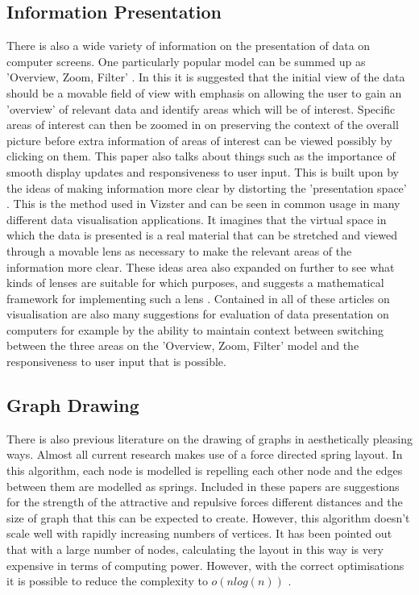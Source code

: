 \documentclass[12pt,a4paper]{article}
\begin{document}
\subsection{Information Presentation}
There is also a wide variety of information on the presentation of data on computer screens. One particularly popular model can be summed up as 'Overview, Zoom, Filter' \cite{shneiderman1996eyes}. In this it is suggested that the initial view of the data should be a movable field of view with emphasis on allowing the user to gain an 'overview' of relevant data and identify areas which will be of interest. Specific areas of interest can then be zoomed in on preserving the context of the overall picture before extra information of areas of interest can be viewed possibly by clicking on them. This paper also talks about things such as the importance of smooth display updates and responsiveness to user input. This is built upon by the ideas of making information more clear by distorting the 'presentation space' \cite{carpendale2001framework}. This is the method used in Vizster and can be seen in common usage in many different data visualisation applications. It imagines that the virtual space in which the data is presented is a real material that can be stretched and viewed through a movable lens as necessary to make the relevant areas of the information more clear. These ideas area also expanded on further to see what kinds of lenses are suitable for which purposes, and suggests a mathematical framework for implementing such a lens \cite{leung1994review}. Contained in all of these articles on visualisation are also many suggestions for evaluation of data presentation on computers for example by the ability to maintain context between switching between the three areas on the 'Overview, Zoom, Filter' model and the responsiveness to user input that is possible.

\subsection{Graph Drawing}
There is also previous literature on the drawing of graphs in aesthetically pleasing ways. Almost all current research makes use of a force directed spring layout. In this algorithm, each node is modelled is repelling each other node and the edges between them are modelled as springs\cite{fruchterman1991graph}. Included in these papers are suggestions for the strength of the attractive and repulsive forces different distances and the size of graph that this can be expected to create. However, this algorithm doesn't scale well with rapidly increasing numbers of vertices. It has been pointed out that with a large number of nodes, calculating the layout in this way is very expensive in terms of computing power. However, with the correct optimisations it is possible to reduce the complexity to $o(nlog(n))$ \cite{barnes1986hierarchical}.
\end{document}
